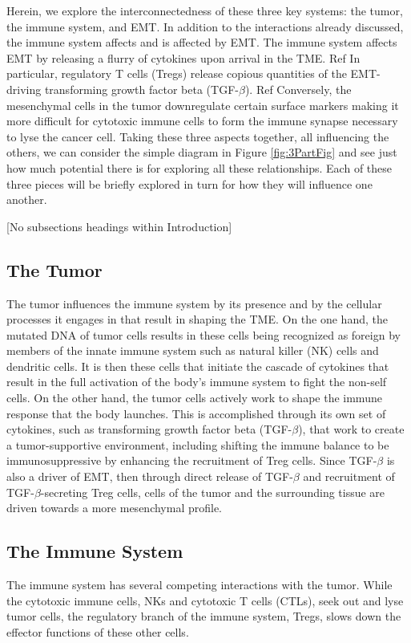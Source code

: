 \documentclass{article}
\begin{document}
Herein, we explore the interconnectedness of these three key systems: the tumor, the immune system, and EMT.
In addition to the interactions already discussed, the immune system affects and is affected by EMT.
The immune system affects EMT by releasing a flurry of cytokines upon arrival in the TME. Ref 
In particular, regulatory T cells (Tregs) release copious quantities of the EMT-driving transforming growth factor beta (TGF-$\beta$). Ref 
Conversely, the mesenchymal cells in the tumor downregulate certain surface markers making it more difficult for cytotoxic immune cells to form the immune synapse necessary to lyse the cancer cell.
Taking these three aspects together, all influencing the others, we can consider the simple diagram in Figure \ref{fig:3PartFig} and see just how much potential there is for exploring all these relationships.
Each of these three pieces will be briefly explored in turn for how they will influence one another.

[No subsections headings within Introduction]
\subsection{The Tumor}\label{TheTumor}
The tumor influences the immune system by its presence and by the cellular processes it engages in that result in shaping the TME.
On the one hand, the mutated DNA of tumor cells results in these cells being recognized as foreign by members of the innate immune system such as natural killer (NK) cells and dendritic cells.
It is then these cells that initiate the cascade of cytokines that result in the full activation of the body's immune system to fight the non-self cells.
On the other hand, the tumor cells actively work to shape the immune response that the body launches.
This is accomplished through its own set of cytokines, such as transforming growth factor beta (TGF-$\beta$), that work to create a tumor-supportive environment, including shifting the immune balance to be immunosuppressive by enhancing the recruitment of Treg cells. Since TGF-$\beta$ is also a driver of EMT, then through direct release of TGF-$\beta$ and recruitment of TGF-$\beta$-secreting Treg cells, cells of the tumor and the surrounding tissue are driven towards a more mesenchymal profile. 


\subsection{The Immune System}\label{TheImmuneSystem}
The immune system has several competing interactions with the tumor.
While the cytotoxic immune cells, NKs and cytotoxic T cells (CTLs), seek out and lyse tumor cells, the regulatory branch of the immune system, Tregs, slows down the effector functions of these other cells.
\end{document}
